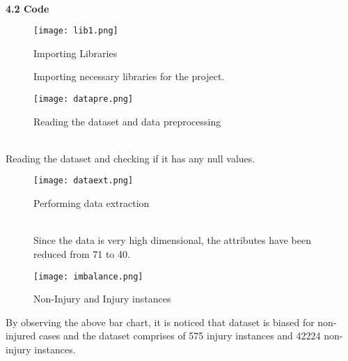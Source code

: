 \documentclass[12pt, English]{article}
\begin{document}
\begin{normalsize}
\\
\newpage
\begin{large}
\textbf{4.2 Code }\\
\end{large}
\begin{figure}[htb]
\begin{center}
\texttt{[image: lib1.png]}
\end{center}
\begin{center}
\renewcommand{\thefigure}{4.2.1}
\caption{\footnotesize Importing Libraries }
\end{center}
Importing necessary libraries for the project.
\begin{center}
\texttt{[image: datapre.png]}
\end{center}
\begin{center}
\renewcommand{\thefigure}{4.2.2}
\caption{\footnotesize Reading the dataset and data preprocessing }
\end{center}
\end{figure}
\\
Reading the dataset and checking if it has any null values.
\newpage
\begin{figure}[htb]
\begin{center}
\texttt{[image: dataext.png]}
\end{center}
\begin{center}
\renewcommand{\thefigure}{4.2.3}
\caption{\footnotesize Performing data extraction}
\end{center}
\\
Since the data is very high dimensional, the attributes have been reduced from 71 to 40.
\begin{center}
\texttt{[image: imbalance.png]}
\end{center}
\begin{center}
\renewcommand{\thefigure}{4.2.4}
\caption{\footnotesize Non-Injury and Injury instances}
\end{center}
\end{figure}
By observing the above bar chart, it is noticed that dataset is biased for non-injured cases and the dataset comprises of 575 injury instances and 42224 non-injury instances.\\


\end{normalsize}
\end{document}
